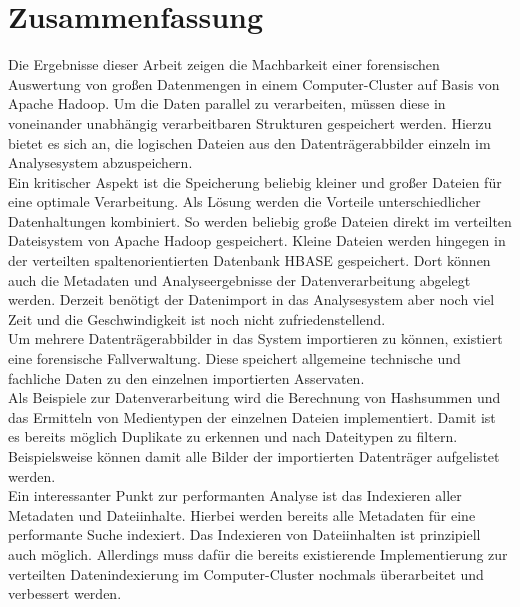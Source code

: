 \chapter{Zusammenfassung}
\label{ch:zusammenfassung}

Die Ergebnisse dieser Arbeit zeigen die Machbarkeit einer forensischen Auswertung von großen Datenmengen in einem Computer-Cluster auf Basis von Apache Hadoop. Um die Daten parallel zu verarbeiten, müssen diese in voneinander unabhängig verarbeitbaren Strukturen gespeichert werden. Hierzu bietet es sich an, die logischen Dateien aus den Datenträgerabbilder einzeln im Analysesystem abzuspeichern.\\
Ein kritischer Aspekt ist die Speicherung beliebig kleiner und großer Dateien für eine optimale Verarbeitung. Als Lösung werden die Vorteile unterschiedlicher Datenhaltungen kombiniert. So werden beliebig große Dateien direkt im verteilten Dateisystem von Apache Hadoop gespeichert. Kleine Dateien werden hingegen in der verteilten spaltenorientierten Datenbank HBASE gespeichert. Dort können auch die Metadaten und Analyseergebnisse der Datenverarbeitung abgelegt werden. Derzeit benötigt der Datenimport in das Analysesystem aber noch viel Zeit und die Geschwindigkeit ist noch nicht zufriedenstellend.\\
Um mehrere Datenträgerabbilder in das System importieren zu können, existiert eine forensische Fallverwaltung. Diese speichert allgemeine technische und fachliche Daten zu den einzelnen importierten Asservaten.\\

\noindent
Als Beispiele zur Datenverarbeitung wird die Berechnung von Hashsummen und das Ermitteln von Medientypen der einzelnen Dateien implementiert. Damit ist es bereits möglich Duplikate zu erkennen und nach Dateitypen zu filtern. Beispielsweise können damit alle Bilder der importierten Datenträger aufgelistet werden.\\
Ein interessanter Punkt zur performanten Analyse ist das Indexieren aller Metadaten und Dateiinhalte. Hierbei werden bereits alle Metadaten für eine performante Suche indexiert. Das Indexieren von Dateiinhalten ist prinzipiell auch möglich. Allerdings  muss dafür die bereits existierende Implementierung zur verteilten Datenindexierung im Computer-Cluster nochmals überarbeitet und verbessert werden.\\

